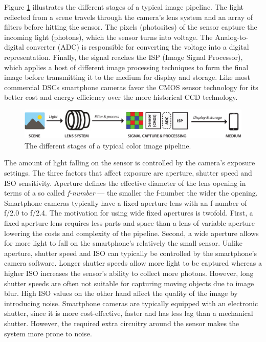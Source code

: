 \documentclass[thesis.tex]{subfiles}
\begin{document}
Figure \ref{figure:pipeline} illustrates the different stages of a typical image pipeline. The light reflected from a scene travels through the camera's lens system and an array of filters before hitting the sensor. The pixels (photosites) of the sensor capture the incoming light (photons), which the sensor turns into voltage. The Analog-to-digital converter (ADC) is responsible for converting the voltage into a digital representation. Finally, the signal reaches the ISP (Image Signal Processor), which applies a host of different image processing techniques to form the final image before transmitting it to the medium for display and storage. Like most commercial DSCs smartphone cameras favor the CMOS sensor technology for its better cost and energy efficiency over the more historical CCD technology.

\begin{figure}[ht]
\centering \includegraphics[width=\textwidth]{images/pipeline}
\caption{The different stages of a typical color image pipeline.\label{figure:pipeline}}
\end{figure}

The amount of light falling on the sensor is controlled by the camera's exposure settings. The three factors that affect exposure are aperture, shutter speed and ISO sensitivity. Aperture defines the effective diameter of the lens opening in terms of a so called \textit{f-number} --- the smaller the f-number the wider the opening. Smartphone cameras typically have a fixed aperture lens with an f-number of f/2.0 to f/2.4. The motivation for using wide fixed apertures is twofold. First, a fixed aperture lens requires less parts and space than a lens of variable aperture lowering the costs and complexity of the pipeline. Second, a wide aperture allows for more light to fall on the smartphone's relatively the small sensor. Unlike aperture, shutter speed and ISO can typically be controlled by the smartphone's camera software. Longer shutter speeds allow more light to be captured whereas a higher ISO increases the sensor's ability to collect more photons. However, long shutter speeds are often not suitable for capturing moving objects due to image blur. High ISO values on the other hand affect the quality of the image by introducing noise. Smartphone cameras are typically equipped with an electronic shutter, since it is more cost-effective, faster and has less lag than a mechanical shutter. However, the required extra circuitry around the sensor makes the system more prone to noise.
\end{document}
